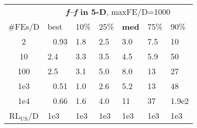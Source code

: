 \begin{tabular}{c|llllll}
 & \multicolumn{6}{|c}{\textbf{\textit{f}\raisebox{-0.35ex}{1}--\textit{f}\raisebox{-0.35ex}{24} in 5-D}, maxFE/D=1000}\\
\#FEs/D & best & 10\% & 25\% & \textbf{med} & 75\% & 90\%\\
2 & ~\,0.93 & \hspace*{1ex}1.8 & \hspace*{1ex}2.5 & \hspace*{1ex}3.0 & \hspace*{1ex}7.5 & 10\\
10 & \hspace*{1ex}2.4 & \hspace*{1ex}3.3 & \hspace*{1ex}3.5 & \hspace*{1ex}4.5 & \hspace*{1ex}5.9 & 50\\
100 & \hspace*{1ex}2.5 & \hspace*{1ex}3.1 & \hspace*{1ex}5.0 & \hspace*{1ex}8.0 & 13 & 27\\
1e3 & ~\,0.51 & \hspace*{1ex}1.0 & \hspace*{1ex}2.6 & \hspace*{1ex}5.2 & 13 & 48\\
1e4 & ~\,0.66 & \hspace*{1ex}1.6 & \hspace*{1ex}4.0 & 11 & 37 & 1.9e2\\
$\text{RL}_{\text{US}}$/D & 1e3 & 1e3 & 1e3 & 1e3 & 1e3 & 1e3
\end{tabular}
